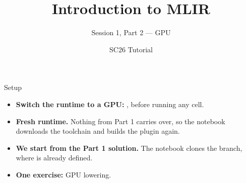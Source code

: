 \documentclass[aspectratio=169,10pt]{beamer}
\title{Introduction to MLIR}
\subtitle{Session 1, Part 2 --- GPU}
\author{SC26 Tutorial}
\date{}
\begin{document}
\begin{frame}[plain]
  \titlepage
\end{frame}

\begin{frame}{Setup}
  \vspace{0.6em}
  \begin{itemize}
    \item<1-> \textbf{Switch the runtime to a GPU:}
      , before running any cell.
    \item<2-> \textbf{Fresh runtime.} Nothing from Part 1 carries
      over, so the notebook downloads the toolchain and builds the plugin
      again.
    \item<3-> \textbf{We start from the Part 1 solution.} The notebook clones the
       branch, where  is already
      defined.
    \item<4-> \textbf{One exercise:} GPU lowering.
  \end{itemize}
\end{frame}
\end{document}
